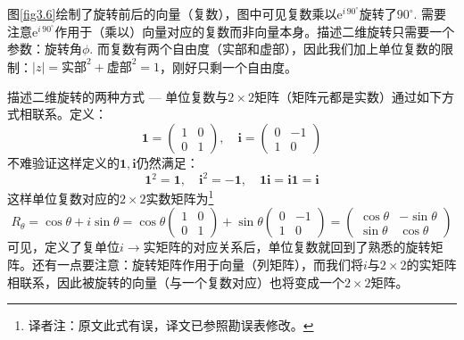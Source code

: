 图\ref{fig3.6}绘制了旋转前后的向量（复数），图中可见复数乘以$\mathrm{e}^{i\, 90^\circ}$旋转了$90^\circ$.
\label{fig3.6}
需要注意$\mathrm{e}^{i\, 90^\circ}$作用于（乘以）向量对应的复数而非向量本身。描述二维旋转只需要一个参数：旋转角$\phi$. 而复数有两个自由度（实部和虚部），因此我们加上单位复数的限制：$|z| = \text{实部}^2 + \text{虚部}^2 = 1$，刚好只剩一个自由度。

描述二维旋转的两种方式 --- 单位复数与$2 \times 2$矩阵（矩阵元都是实数）通过如下方式相联系。定义：
\begin{equation}
\label{equ3.15}
\mathbf{1} =
	\begin{pmatrix}
		1 & 0 \\ 0 & 1
	\end{pmatrix}
,\quad
\mathbf{i} =
	\begin{pmatrix}
		0 & -1 \\ 1 & 0
	\end{pmatrix}
\end{equation}
不难验证这样定义的$\mathbf{1, i}$仍然满足：
\begin{equation}
\mathbf{1}^2 = \mathbf{1},\quad \mathbf{i}^2 = -\mathbf{1},\quad \mathbf{1i} = \mathbf{i1} = \mathbf{i}
\end{equation}
这样单位复数对应的$2 \times 2$实数矩阵为\footnote{译者注：原文此式有误，译文已参照勘误表修改。}
\begin{equation}
\label{equ3.17}
R_\theta = \cos \theta + i\sin\theta = \cos \theta
\begin{pmatrix}
	1 & 0 \\ 0 & 1
\end{pmatrix}
+ \sin \theta
\begin{pmatrix}
	0 & -1 \\ 1 & 0
\end{pmatrix}
=
\begin{pmatrix}
	\cos \theta & -\sin \theta \\
	\sin \theta & \cos \theta
\end{pmatrix}
\end{equation}
可见，定义了复单位$i \rightarrow \text{实矩阵}$的对应关系后，单位复数就回到了熟悉的旋转矩阵。还有一点要注意：旋转矩阵作用于向量（列矩阵），而我们将$i$与$2 \times 2$的实矩阵相联系，因此被旋转的向量（与一个复数对应）也将变成一个$2 \times 2$矩阵。

